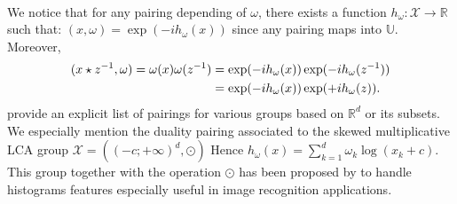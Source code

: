 \paragraph{}
We notice that for any pairing depending of $\omega$, there exists a function $h_{\omega}: \mathcal{X} \to \mathbb{R}$ such that: $(x,\omega)= \exp(-i h_{\omega}(x))$ since any pairing maps into $\mathbb{U}$. Moreover, 
\begin{equation*}
\begin{aligned}
(x \star {z}^{-1},\omega) = \omega(x)\omega({z}^{-1}) &=\exp(-i h_{\omega}(x))\exp(-i h_{\omega}({z}^{-1})) \\
&=\exp(-i h_{\omega}(x))\exp(+i h_{\omega}(z)).
\end{aligned}
\end{equation*}
 provide an explicit list of pairings for various groups based on $\mathbb{R}^d$ or its subsets. We especially mention the duality pairing associated to the skewed multiplicative LCA group $\mathcal{X}=((-c;+\infty)^d, \odot)$
Hence $h_\omega(x)=\sum_{k=1}^d\omega_k \log(x_k+c)$. This group together with the operation $\odot$ has  been proposed by \cite{li2010random} to handle histograms features especially useful in image recognition applications.
